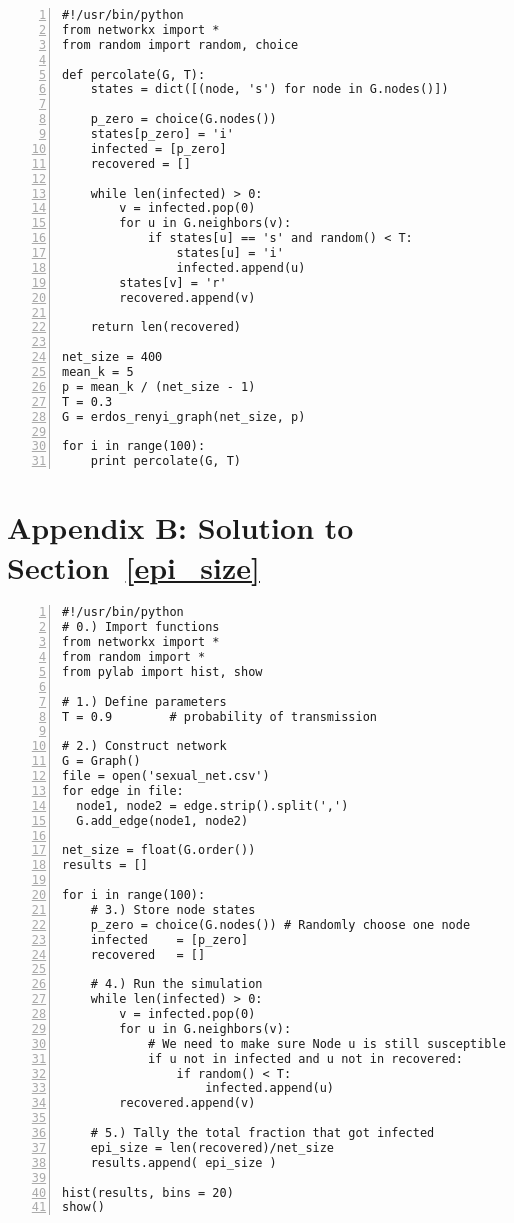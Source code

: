 \documentclass{article}
\begin{document}
\begin{Verbatim}[samepage=true, numbers=left]
#!/usr/bin/python
from networkx import *
from random import random, choice

def percolate(G, T):
    states = dict([(node, 's') for node in G.nodes()])

    p_zero = choice(G.nodes())
    states[p_zero] = 'i'
    infected = [p_zero]
    recovered = []

    while len(infected) > 0:
        v = infected.pop(0)
        for u in G.neighbors(v):
            if states[u] == 's' and random() < T:
                states[u] = 'i'
                infected.append(u)
        states[v] = 'r'
        recovered.append(v)

    return len(recovered)

net_size = 400
mean_k = 5
p = mean_k / (net_size - 1)
T = 0.3
G = erdos_renyi_graph(net_size, p)

for i in range(100):
    print percolate(G, T)
\end{Verbatim}

\pagebreak
\section*{Appendix B: Solution to Section~\ref{epi_size}}

\begin{Verbatim}[numbers=left, samepage=true]
#!/usr/bin/python
# 0.) Import functions
from networkx import *
from random import *
from pylab import hist, show

# 1.) Define parameters
T = 0.9        # probability of transmission

# 2.) Construct network
G = Graph()
file = open('sexual_net.csv')
for edge in file:
  node1, node2 = edge.strip().split(',')
  G.add_edge(node1, node2)

net_size = float(G.order())
results = []

for i in range(100):
    # 3.) Store node states
    p_zero = choice(G.nodes()) # Randomly choose one node
    infected    = [p_zero]
    recovered   = []

    # 4.) Run the simulation
    while len(infected) > 0:
        v = infected.pop(0)
        for u in G.neighbors(v):
            # We need to make sure Node u is still susceptible
            if u not in infected and u not in recovered:
                if random() < T:
                    infected.append(u)
        recovered.append(v)

    # 5.) Tally the total fraction that got infected
    epi_size = len(recovered)/net_size
    results.append( epi_size )

hist(results, bins = 20)
show()
\end{Verbatim}
\end{document}
